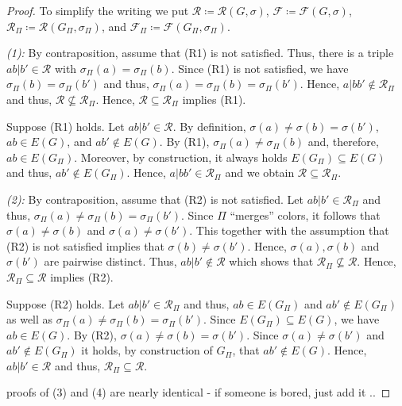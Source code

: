 \documentclass[final,3p,times]{elsarticle}
\newcommand{\TODO}[1]{\begingroup\color{red}#1\endgroup}
\begin{document}
\begin{proof}
	To simplify the writing we put $\mathscr{R}\coloneqq \mathscr{R}(G,\sigma)$, 
	$\mathscr{F}\coloneqq \mathscr{F}(G,\sigma)$, 
	$\mathscr{R}_\Pi\coloneqq \mathscr{R}(G_\Pi,\sigma_\Pi)$, and
	$\mathscr{F}_\Pi\coloneqq \mathscr{F}(G_\Pi,\sigma_\Pi)$. 

	\emph{(1): }
	By contraposition, assume that (R1) is not satisfied. Thus, there is a
	triple $ab|b' \in \mathscr{R}$ with $\sigma_\Pi(a) =
	\sigma_\Pi(b)$. Since (R1) is not satisfied, we have
	$\sigma_\Pi(b)=\sigma_\Pi(b')$ and thus,
	$\sigma_\Pi(a)=\sigma_\Pi(b)=\sigma_\Pi(b')$. Hence, $a|bb'\notin
	\mathscr{R}_\Pi$ and thus, $\mathscr{R}
	\not\subseteq \mathscr{R}_\Pi$. Hence, $\mathscr{R}
	\subseteq \mathscr{R}_\Pi$ implies (R1).
    
    Suppose (R1) holds. Let $ab|b' \in \mathscr{R}$. By definition,
    $\sigma(a)\neq\sigma(b)=\sigma(b')$, $ab\in E(G)$, and $ab'\notin E(G)$. By
    (R1), $\sigma_\Pi(a) \neq \sigma_\Pi(b)$ and, therefore, $ab\in E(G_\Pi)$.
    Moreover, by construction, it always holds $E(G_\Pi)\subseteq E(G)$ and
    thus, $ab'\notin E(G_\Pi)$. Hence, $a|bb'\in \mathscr{R}_\Pi$
    and we obtain $\mathscr{R}\subseteq
    \mathscr{R}_\Pi$. 
    
	\emph{(2):}
	By contraposition, assume that (R2) is not satisfied. 
	Let $ab|b' \in \mathscr{R}_\Pi$ and thus, 
	$\sigma_\Pi(a)\neq \sigma_\Pi(b) = \sigma_\Pi(b')$. 
	Since $\Pi$ ``merges'' colors, it follows that 
	$\sigma(a)\neq \sigma(b)$ and $\sigma(a)\neq \sigma(b')$. 
	This together with the
	assumption that (R2) is not satisfied implies
	that $\sigma(b) \neq \sigma(b')$. Hence, 
	$\sigma(a),  \sigma(b)$ and $\sigma(b')$ are pairwise
	distinct. Thus, $ab|b' \not\in \mathscr{R}$
	which shows that $\mathscr{R}_\Pi \not\subseteq  \mathscr{R}$. 
	Hence, $\mathscr{R}_\Pi \subseteq  \mathscr{R}$ implies (R2). 
	
	Suppose (R2) holds. Let $ab|b' \in \mathscr{R}_\Pi$
	and thus, $ab\in E(G_\Pi)$ and $ab'\notin E(G_\Pi)$
	as well as $\sigma_\Pi(a)\neq\sigma_\Pi(b)=\sigma_\Pi(b')$. 
	Since $E(G_\Pi)\subseteq E(G)$, we have $ab\in E(G)$. 
	By (R2), $\sigma(a)\neq\sigma(b) = \sigma(b')$.
	Since	$\sigma(a)\neq\sigma(b')$ and
	$ab'\notin E(G_\Pi)$ it holds, by construction of $G_\Pi$, 
	that $ab'\notin E(G)$. Hence, $ab|b' \in \mathscr{R}$
	and thus, $\mathscr{R}_\Pi \subseteq  \mathscr{R}$. 
	
	
	\TODO{proofs of (3) and (4) are nearly identical - if someone
	is bored, just add it ..}
\end{proof}
\end{document}
